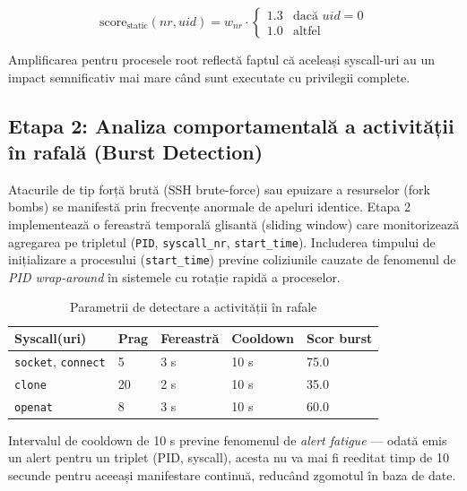 \begin{equation}
    \text{score}_{\text{static}}(nr, uid) = w_{nr} \cdot \begin{cases} 1.3 & \text{dacă } uid = 0 \\ 1.0 & \text{altfel} \end{cases}
    \label{eq:static_score}
\end{equation}

\par Amplificarea pentru procesele root reflectă faptul că aceleași syscall-uri au un impact semnificativ mai mare când sunt executate cu privilegii complete.


\subsection{Etapa 2: Analiza comportamentală a activității în rafală (Burst Detection)}
\label{subsec:burst_detection}

\par Atacurile de tip forță brută (SSH brute-force) sau epuizare a resurselor (fork bombs) se manifestă prin frecvențe anormale de apeluri identice. Etapa 2 implementează o fereastră temporală glisantă (sliding window) care monitorizează agregarea pe tripletul (\texttt{PID}, \texttt{syscall\_nr}, \texttt{start\_time}). Includerea timpului de inițializare a procesului (\texttt{start\_time}) previne coliziunile cauzate de fenomenul de \textit{PID wrap-around} în sistemele cu rotație rapidă a proceselor.

\begin{table}[htbp]
\begin{center}
\begin{tabular}{|p{90pt}|p{50pt}|p{70pt}|p{55pt}|p{60pt}|}
\hline
\textbf{Syscall(uri)} & \textbf{Prag} & \textbf{Fereastră} & \textbf{Cooldown} & \textbf{Scor burst} \\
\hline\hline
\texttt{socket}, \texttt{connect} & 5  & 3 s  & 10 s & 75.0 \\
\hline
\texttt{clone}                     & 20 & 2 s  & 10 s & 35.0 \\
\hline
\texttt{openat}                    & 8  & 3 s  & 10 s & 60.0 \\
\hline
\end{tabular}
\end{center}
\caption{Parametrii de detectare a activității în rafale}
\label{tab:burst_params}
\end{table}

\par Intervalul de cooldown de 10 s previne fenomenul de \textit{alert fatigue} --- odată emis un alert pentru un triplet (PID, syscall), acesta nu va mai fi reeditat timp de 10 secunde pentru aceeași manifestare continuă, reducând zgomotul în baza de date.


